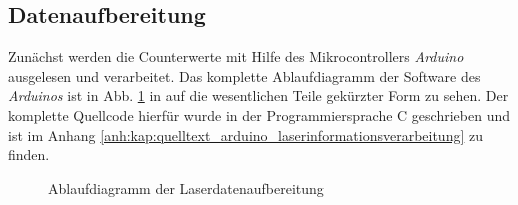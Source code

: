 \subsection{Datenaufbereitung}\label{subsec:datenaufbereitung}
Zunächst werden die Counterwerte mit Hilfe des Mikrocontrollers \textit{Arduino}
ausgelesen und verarbeitet. Das komplette Ablaufdiagramm der Software des
\textit{Arduinos} ist in Abb. \ref{fig:ablaufdiagramm_arduino_laser} in auf die
wesentlichen Teile gekürzter Form zu sehen. Der komplette Quellcode hierfür
wurde in der Programmiersprache C geschrieben und ist im Anhang
\ref{anh:kap:quelltext_arduino_laserinformationsverarbeitung} zu finden.
\begin{figure}[hp]
 	\centering
	\caption[Laserdatenaufbereitung -
	Ablaufdiagramm]{Ablaufdiagramm der
	Laserdatenaufbereitung}\label{fig:ablaufdiagramm_arduino_laser}
\end{figure}
